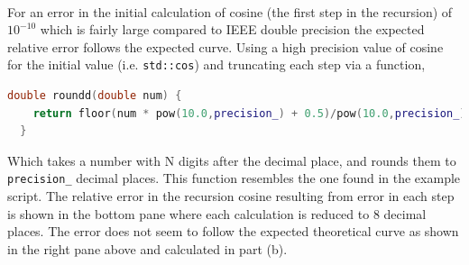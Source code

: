 \documentclass[singlepage,notitlepage,nofootinbib,12pt]{revtex4-1}
\begin{document}
\\
For an error in the initial calculation of cosine (the first step in the recursion) of $10^{-10}$ which is fairly large compared to IEEE double precision the expected relative error follows the expected curve. Using a high precision value of cosine for the initial value (i.e. \verb|std::cos|) and truncating each step via a function,
\begin{lstlisting}[language=C++]
  double roundd(double num) {
    return floor(num * pow(10.0,precision_) + 0.5)/pow(10.0,precision_);
  }
\end{lstlisting}
Which takes a number with N digits after the decimal place, and rounds them to \verb|precision_| decimal places. This function resembles the one found in the example script. The relative error in the recursion cosine resulting from error in each step is shown in the bottom pane where each calculation is reduced to 8 decimal places. The error does not seem to follow the expected theoretical curve as shown in the right pane above and calculated in part (b).
\end{document}
